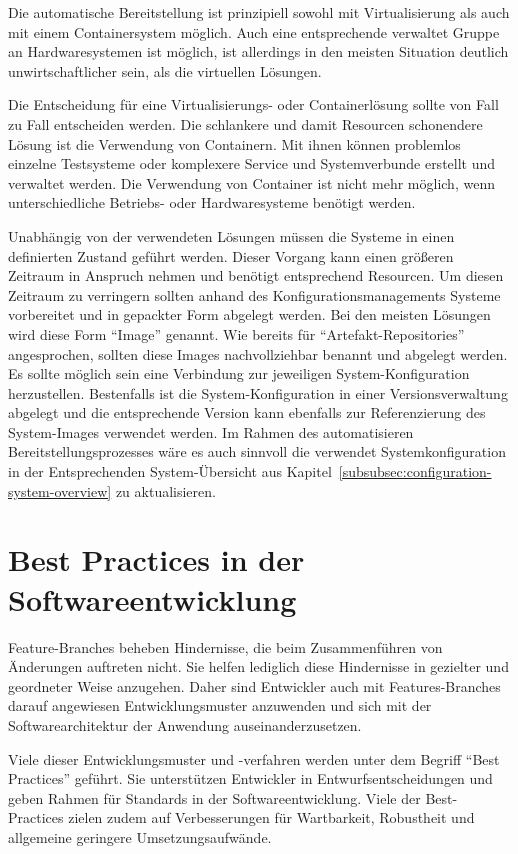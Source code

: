 Die automatische Bereitstellung ist prinzipiell sowohl mit Virtualisierung als auch mit einem Containersystem möglich. Auch eine entsprechende verwaltet Gruppe an Hardwaresystemen ist möglich, ist allerdings in den meisten Situation deutlich unwirtschaftlicher sein, als die virtuellen Lösungen.

Die Entscheidung für eine Virtualisierungs- oder Containerlösung sollte von Fall zu Fall entscheiden werden. Die schlankere und damit Resourcen schonendere Lösung ist die Verwendung von Containern. Mit ihnen können problemlos einzelne Testsysteme oder komplexere Service und Systemverbunde erstellt und verwaltet werden. Die Verwendung von Container ist nicht mehr möglich, wenn unterschiedliche Betriebs- oder Hardwaresysteme benötigt werden.

Unabhängig von der verwendeten Lösungen müssen die Systeme in einen definierten Zustand geführt werden. Dieser Vorgang kann einen größeren Zeitraum in Anspruch nehmen und benötigt entsprechend Resourcen. Um diesen Zeitraum zu verringern sollten anhand des Konfigurationsmanagements Systeme vorbereitet und in gepackter Form abgelegt werden. Bei den meisten Lösungen wird diese Form ``Image'' genannt. Wie bereits für ``Artefakt-Repositories'' angesprochen, sollten diese Images nachvollziehbar benannt und abgelegt werden. Es sollte möglich sein eine Verbindung zur jeweiligen System-Konfiguration herzustellen. Bestenfalls ist die System-Konfiguration in einer Versionsverwaltung abgelegt und die entsprechende Version kann ebenfalls zur Referenzierung des System-Images verwendet werden. Im Rahmen des automatisieren Bereitstellungsprozesses wäre es auch sinnvoll die verwendet Systemkonfiguration in der Entsprechenden System-Übersicht aus Kapitel~\ref{subsubsec:configuration-system-overview} zu aktualisieren.

\section{Best Practices in der Softwareentwicklung}

Feature-Branches beheben Hindernisse, die beim Zusammenführen von Änderungen auftreten nicht. Sie helfen lediglich diese Hindernisse in gezielter und geordneter Weise anzugehen. Daher sind Entwickler auch mit Features-Branches darauf angewiesen Entwicklungsmuster anzuwenden und sich mit der Softwarearchitektur der Anwendung auseinanderzusetzen.

Viele dieser Entwicklungsmuster und -verfahren werden unter dem Begriff ``Best Practices'' geführt. Sie unterstützen Entwickler in Entwurfsentscheidungen und geben Rahmen für Standards in der Softwareentwicklung. Viele der Best-Practices zielen zudem auf Verbesserungen für Wartbarkeit, Robustheit und allgemeine geringere Umsetzungsaufwände.

